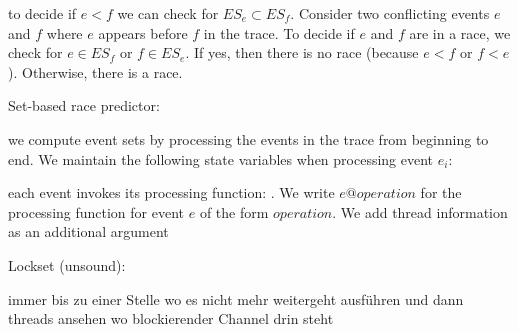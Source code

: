 \documentclass[landscape, a4paper]{article}
\begin{document}
\begin{minipage}[t]{0.2\linewidth}
\begin{betterlist}
\begin{betterlist}
\begin{betterlist}
				\item to decide if $e < f$ we can check for $ES_{e} \subset ES_{f}$. Consider two conflicting events $e$ and $f$ where $e$ appears before $f$ in the trace. To decide if $e$ and $f$ are in a race, we check for $e \in ES_f$ or $f \in ES_e$. If yes, then there is no race (because $e < f$ or $f < e$). Otherwise, there is a race.
				\item {}
				\item \alert{Set-based race predictor:}
				\begin{betterlist}
					\item we compute event sets by processing the events in the trace from beginning to end. We maintain the following state variables when processing event $e_i$: 
					\item each event invokes its processing function: . We write $e@operation$ for the processing function for event $e$ of the form $operation$. We add thread information as an additional argument
				\end{betterlist}
			\end{betterlist}
      \item {}
		\end{betterlist}
		\item \alert{Lockset (unsound)}:
	\end{betterlist}
\end{minipage}
\begin{minipage}[t]{0.2\linewidth}
\end{minipage}

\newpage

\begin{minipage}[t]{0.2\linewidth}
	\fbox{Tricks}
	\begin{betterlist}
		\item immer bis zu einer Stelle wo es nicht mehr weitergeht ausführen und dann threads ansehen wo blockierender Channel drin steht
	\end{betterlist}
\end{minipage}
\begin{minipage}[t]{0.2\linewidth}
\end{minipage}
\begin{minipage}[t]{0.2\linewidth}
\end{minipage}
\begin{minipage}[t]{0.2\linewidth}
\end{minipage}
\begin{minipage}[t]{0.2\linewidth}
\end{minipage}
\end{document}
